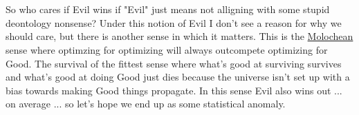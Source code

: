 \\\\
So who cares if Evil wins if "Evil" just means not alligning with some stupid deontology nonsense? Under this notion of Evil I don't see a reason for why we should care, but there is another sense in which it matters. This is the \href{https://slatestarcodex.com/2014/07/30/meditations-on-moloch/}{Molochean} sense where optimzing for optimizing will always outcompete optimizing for Good. The survival of the fittest sense where what's good at surviving survives and what's good at doing Good just dies because the universe isn't set up with a bias towards making Good things propagate. In this sense Evil also wins out ... on average ... so let's hope we end up as some statistical anomaly.




